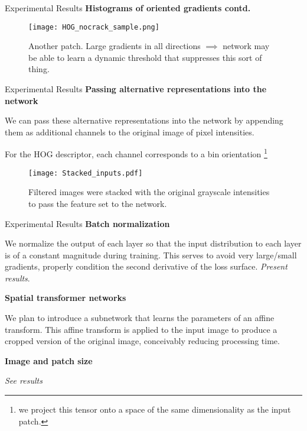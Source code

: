 \documentclass[10pt]{beamer}
\begin{document}
\begin{frame}{Experimental Results}
\textbf{Histograms of oriented gradients contd.}

\begin{figure}
	\texttt{[image: HOG\_nocrack\_sample.png]}
	\caption{Another patch. Large gradients in all directions $\implies$ network may be able to learn a dynamic threshold that suppresses this sort of thing.}
\end{figure}

\end{frame}

\begin{frame}{Experimental Results}
\textbf{Passing alternative representations into the network}

We can pass these alternative representations into the network by appending them as additional channels to the original image of pixel intensities.

For the HOG descriptor, each channel corresponds to a bin orientation \footnote{we project this tensor onto a space of the same dimensionality as the input patch.}
\begin{figure}
	\texttt{[image: Stacked\_inputs.pdf]}
	\caption{Filtered images were stacked with the original grayscale intensities to pass the feature set to the network.}
\end{figure}

\end{frame}

\begin{frame}{Experimental Results}
\textbf{Batch normalization}

We normalize the output of each layer so that the input distribution to each layer is of a constant magnitude during training. This serves to avoid very large/small gradients, properly condition the second derivative of the loss surface. \emph{Present results}.

\textbf{Spatial transformer networks}

We plan to introduce a subnetwork that learns the parameters of an affine transform. This affine transform is applied to the input image to produce a cropped version of the original image, conceivably reducing processing time.

\textbf{Image and patch size}

\emph{See results }


\end{frame}
\end{document}
